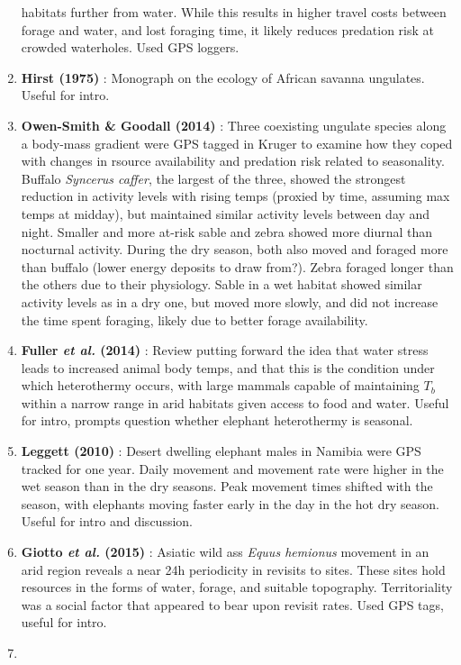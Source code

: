 \documentclass[10pt,twocolumn]{paper}
\begin{document}
\begin{enumerate}
  habitats further from water. While this results in higher travel costs
  between forage and water, and lost foraging time, it likely reduces
  predation risk at crowded waterholes. Used GPS loggers.
\item
  \textbf{Hirst (1975)} : Monograph on the ecology of African savanna
  ungulates. Useful for intro.
\item
  \textbf{Owen-Smith \& Goodall (2014)} : Three coexisting ungulate
  species along a body-mass gradient were GPS tagged in Kruger to
  examine how they coped with changes in rsource availability and
  predation risk related to seasonality. Buffalo \emph{Syncerus caffer},
  the largest of the three, showed the strongest reduction in activity
  levels with rising temps (proxied by time, assuming max temps at
  midday), but maintained similar activity levels between day and night.
  Smaller and more at-risk sable and zebra showed more diurnal than
  nocturnal activity. During the dry season, both also moved and foraged
  more than buffalo (lower energy deposits to draw from?). Zebra foraged
  longer than the others due to their physiology. Sable in a wet habitat
  showed similar activity levels as in a dry one, but moved more slowly,
  and did not increase the time spent foraging, likely due to better
  forage availability.
\item
  \textbf{Fuller \emph{et al.} (2014)} : Review putting forward the idea
  that water stress leads to increased animal body temps, and that this
  is the condition under which heterothermy occurs, with large mammals
  capable of maintaining \(T_b\) within a narrow range in arid habitats
  given access to food and water. Useful for intro, prompts question
  whether elephant heterothermy is seasonal.
\item
  \textbf{Leggett (2010)} : Desert dwelling elephant males in Namibia
  were GPS tracked for one year. Daily movement and movement rate were
  higher in the wet season than in the dry seasons. Peak movement times
  shifted with the season, with elephants moving faster early in the day
  in the hot dry season. Useful for intro and discussion.
\item
  \textbf{Giotto \emph{et al.} (2015)} : Asiatic wild ass \emph{Equus
  hemionus} movement in an arid region reveals a near 24h periodicity in
  revisits to sites. These sites hold resources in the forms of water,
  forage, and suitable topography. Territoriality was a social factor
  that appeared to bear upon revisit rates. Used GPS tags, useful for
  intro.
\item

\end{enumerate}
\end{document}

